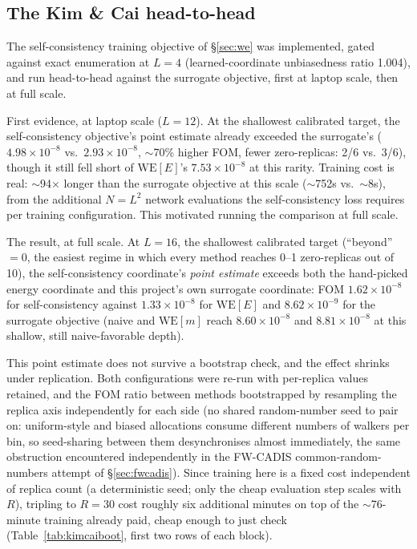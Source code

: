 \documentclass[a4paper,fleqn]{cas-sc}
\let\Oldsubsection\subsection
\renewcommand{\subsection}{\FloatBarrier\Oldsubsection}
\begin{document}
\subsection{The Kim \& Cai head-to-head}\label{sec:kimcai}
The self-consistency training objective of \S\ref{sec:we} was implemented, gated
against exact enumeration at $L=4$ (learned-coordinate unbiasedness ratio 1.004), and run
head-to-head against the surrogate objective, first at laptop scale, then at full scale.

First evidence, at laptop scale ($L=12$). At the shallowest calibrated target, the
self-consistency objective's point estimate already exceeded the surrogate's
($4.98\times10^{-8}$ vs.\ $2.93\times10^{-8}$, $\sim$70\% higher FOM, fewer zero-replicas:
2/6 vs.\ 3/6), though it still fell short of $\mathrm{WE}[E]$'s $7.53\times10^{-8}$ at this
rarity. Training cost is real: $\sim$94$\times$ longer than the surrogate objective at this
scale ($\sim$752s vs.\ $\sim$8s), from the additional $N=L^2$ network evaluations the
self-consistency loss requires per training configuration. This motivated running the
comparison at full scale.

The result, at full scale. At $L=16$, the shallowest calibrated target (``beyond''\,$=0$,
the easiest regime in which every method reaches 0--1 zero-replicas out of 10), the
self-consistency coordinate's \emph{point estimate} exceeds both the hand-picked energy
coordinate and this project's own surrogate coordinate: FOM $1.62\times10^{-8}$ for
self-consistency against $1.33\times10^{-8}$ for $\mathrm{WE}[E]$ and $8.62\times10^{-9}$
for the surrogate objective (naive and $\mathrm{WE}[m]$ reach $8.60\times10^{-8}$ and
$8.81\times10^{-8}$ at this shallow, still naive-favorable depth).

This point estimate does not survive a bootstrap check, and the effect shrinks
	under replication. Both configurations were re-run with per-replica values retained, and
the FOM ratio between methods bootstrapped by resampling the replica axis independently for
each side (no shared random-number seed to pair on: uniform-style and biased allocations
consume different numbers of walkers per bin, so seed-sharing between them desynchronises
almost immediately, the same obstruction encountered independently in the FW-CADIS
common-random-numbers attempt of \S\ref{sec:fwcadis}). Since training here is a fixed cost
independent of replica count (a deterministic seed; only the cheap evaluation step scales
with $R$), tripling to $R=30$ cost roughly six additional minutes on top of the
$\sim$76-minute training already paid, cheap enough to just check
(Table~\ref{tab:kimcaiboot}, first two rows of each block).
\end{document}
